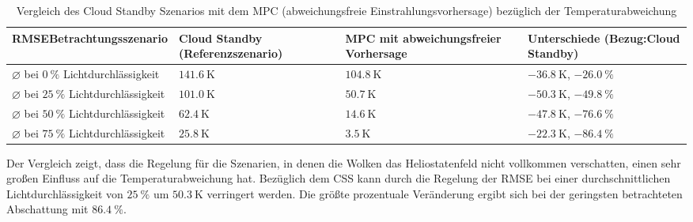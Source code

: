 \begingroup
\renewcommand{\arraystretch}{1.2}
\begin{table}[ht!]
\caption[Vergleich des Cloud Standby Szenarios mit dem MPC (abweichungsfreie Einstrahlungsvorhersage) bezüglich der Temperaturabweichung]{Vergleich des Cloud Standby Szenarios mit dem MPC (abweichungsfreie Einstrahlungsvorhersage) bezüglich der Temperaturabweichung}
    \centering
    \begin{tabular}{>{\centering\arraybackslash}m{}>{\centering\arraybackslash}m{}>{\centering\arraybackslash}m{}>{\centering\arraybackslash}m{}}
        \rowcolor{white}
        \toprule
        RMSE\linebreak Betrachtungsszenario                      & Cloud Standby (Referenzszenario) & MPC mit abweichungsfreier Vorhersage & Unterschiede (Bezug:\linebreak Cloud Standby) \\
        \midrule
        $\diameter$ bei $\SI{0}{\percent}$ Lichtdurchlässigkeit  & $\SI{141.6}{\kelvin}$            & $\SI{104.8}{\kelvin}$                & $\SI{-36.8}{\kelvin}$, $\SI{-26.0}{\percent}$ \\
        $\diameter$ bei $\SI{25}{\percent}$ Lichtdurchlässigkeit & $\SI{101.0}{\kelvin}$            & $\SI{50.7}{\kelvin}$                 & $\SI{-50.3}{\kelvin}$, $\SI{-49.8}{\percent}$ \\
        $\diameter$ bei $\SI{50}{\percent}$ Lichtdurchlässigkeit & $\SI{62.4}{\kelvin}$             & $\SI{14.6}{\kelvin}$                 & $\SI{-47.8}{\kelvin}$, $\SI{-76.6}{\percent}$ \\
        $\diameter$ bei $\SI{75}{\percent}$ Lichtdurchlässigkeit & $\SI{25.8}{\kelvin}$             & $\SI{3.5}{\kelvin}$                  & $\SI{-22.3}{\kelvin}$, $\SI{-86.4}{\percent}$ \\
        \toprule
    \end{tabular}
    \label{tab_Vergleich1}
\end{table}
\endgroup

Der Vergleich zeigt, dass die Regelung für die Szenarien, in denen die Wolken das Heliostatenfeld nicht vollkommen verschatten, einen sehr großen Einfluss auf die Temperaturabweichung hat.
Bezüglich dem CSS kann durch die Regelung der RMSE bei einer durchschnittlichen Lichtdurchlässigkeit von $\SI{25}{\percent}$ um $\SI{50.3}{\kelvin}$ verringert werden.
Die größte prozentuale Veränderung ergibt sich bei der geringsten betrachteten Abschattung mit $\SI{86.4}{\percent}$.

